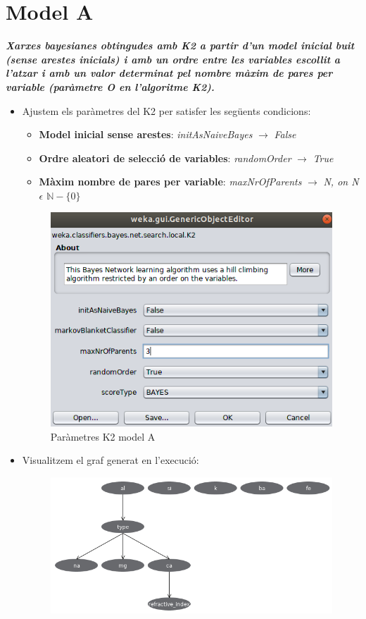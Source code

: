 \documentclass[11pt,a4paper]{article}
\begin{document}
\section{Model A}
\textit{\textbf{Xarxes bayesianes obtingudes amb K2 a partir d'un model inicial buit (sense arestes inicials) i amb un ordre entre les variables escollit a l'atzar i amb un valor determinat pel nombre màxim de pares per variable (paràmetre O en l'algoritme K2).}}\\
\begin{itemize}
\item Ajustem els paràmetres del K2 per satisfer les següents condicions:
	\begin{itemize}
	\item \textbf{Model inicial sense arestes}: \textit{initAsNaiveBayes} $\rightarrow$ \textit{False}
	\item \textbf{Ordre aleatori de selecció de variables}: \textit{randomOrder} $\rightarrow$ \textit{True}
	\item \textbf{Màxim nombre de pares per variable}: \textit{maxNrOfParents} $\rightarrow$ \textit{N, on N $\epsilon$  $\mathbb{N} - \{0\}$ }
	\end{itemize}
	\begin{figure}[hbtp]
	\centering
	\includegraphics[scale=0.4]{Figures/5.png}
	\caption{Paràmetres K2 model A}
	\end{figure}
\item Visualitzem el graf generat en l'execució:
	\begin{figure}[hbtp]
	\centering
	\includegraphics[scale=0.4]{Figures/r1.png}

\end{figure}
\end{itemize}
\end{document}
